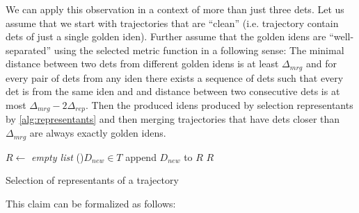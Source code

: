 We can apply this observation in a context of more than just three \glspl{det}.
Let us assume that we  start with trajectories that are ``clean'' (i.e.
trajectory contain \glspl{det} of just a single golden \gls{iden}). Further
assume that the golden \glspl{iden} are ``well-separated'' using the selected
metric function in a following sense: The minimal distance between two
\glspl{det} from different golden \glspl{iden} is at least $\Delta_{mrg}$
and for every pair of \glspl{det} from any \gls{iden} there exists a sequence
of \glspl{det} such that every \gls{det} is from the same \gls{iden} and
and distance between two consecutive \glspl{det} is at most
$\Delta_{mrg} - 2\Delta_{rep}$. Then the produced \glspl{iden} produced by
selection representants by \autoref{alg:representants} and then merging
trajectories that have \glspl{det} closer than $\Delta_{mrg}$
are always exactly golden \glspl{iden}.




\begin{algorithm}

 
 \BlankLine
 $R \leftarrow$ \emph{empty list}\;
 \For(){$D_{new} \in T$}{
  append $D_{new}$ to $R$\;
 }
 \Return $R$
 \caption{Selection of representants of a trajectory}
 \label{alg:representants}
\end{algorithm}


This claim can be formalized as follows:

